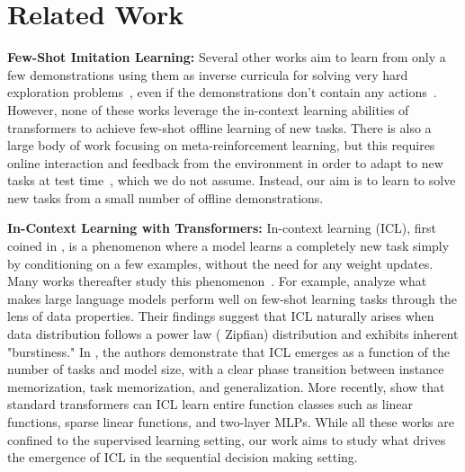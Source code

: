 \section{Related Work}
\label{sec:rel_works}



\textbf{Few-Shot Imitation Learning:}
 Several other works aim to learn from only a few demonstrations using them as inverse curricula for solving very hard exploration problems~\citep{duan2016rl,james2018task,jang2022bc,mandi2022towards}, even if the demonstrations don't contain any actions~\citep{resnick2018backplay,salimans2018learning}. However, none of these works leverage the in-context learning abilities of transformers to achieve few-shot offline learning of new tasks. There is also a large body of work focusing on meta-reinforcement learning, but this requires online interaction and feedback from the environment in order to adapt to new tasks at test time~\citep{schmidhuber1987evolutionary,duan2016rl,finn2017model,pong2022offline, mitchell2021offline,beck2023survey}, which we do not assume. Instead, our aim is to learn to solve new tasks from a small number of offline demonstrations. 

\textbf{In-Context Learning with Transformers:}
In-context learning (ICL), first coined in \citep{gpt3}, is a phenomenon where a model learns a completely new task simply by conditioning on a few examples, without the need for any weight updates. Many works thereafter study this phenomenon~\citep{von2022transformers,chan2022transformers,akyurek2022learning,olsson2022context,hahn2023theory,xie2021explanation,dai2022can}. For example, \citep{zipfian_icl} analyze what makes large language models perform well on few-shot learning tasks through the lens of data properties. Their findings suggest that ICL naturally arises when data distribution follows a power law (\ie{} Zipfian) distribution and exhibits inherent "burstiness."  In \cite{kirsch2022generalpurpose}, the authors demonstrate that ICL emerges as a function of the number of tasks and model size, with a clear phase transition between instance memorization, task memorization, and generalization. More recently, \cite{functionclass} show that standard transformers can ICL learn entire function classes such as linear functions, sparse linear functions, and two-layer MLPs. While all these works are confined to the supervised learning setting, our work aims to study what drives the emergence of ICL in the sequential decision making setting. 

